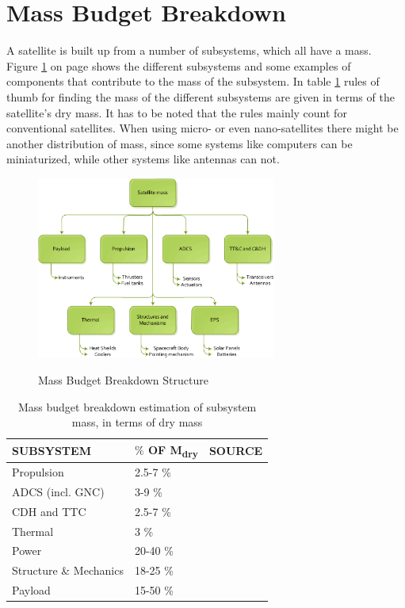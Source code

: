 \section{Mass Budget Breakdown}
\label{sect_mass_budget}
A satellite is built up from a number of subsystems, which all have a mass. Figure \ref{massbreakdown} on page \pageref{massbreakdown} shows the different subsystems and some examples of components that contribute to the mass of the subsystem. In table \ref{rotsubsystemmass} rules of thumb for finding the mass of the different subsystems are given in terms of the satellite's dry mass. It has to be noted that the rules mainly count for conventional satellites. When using micro- or even nano-satellites there might be another distribution of mass, since some systems like computers can be miniaturized, while other systems like antennas can not. 

\begin{figure} [ht]
\centering
\includegraphics[width=0.7\textwidth]{chapters/img/mass_breakdown.png}
\label{massbreakdown}
\caption{Mass Budget Breakdown Structure}
\end{figure}

\begin{table} [h]
\centering
\begin{tabular}{p{12cm} | l | l}
\textbf{SUBSYSTEM} & \textbf{$\%$ OF M\textsubscript{dry}} & \textbf{SOURCE} \\ \hline \hline
Propulsion & 2.5-7 \% & \cite{Space2b} \\ 
\ac{ADCS} (incl. \ac{GNC}) & 3-9 \% & \cite{Space2b} \\ 
\ac{CDH} and \ac{TTC} & 2.5-7 \% & \cite{Space2b} \\ 
Thermal & 3 \% & \cite{larson} \\ 
Power & 20-40 \% & \cite{Space2b} \\ 
Structure \& Mechanics & 18-25 \% & \cite{Space2b} \\ 
Payload & 15-50 \% & \cite{larson} 
\end{tabular} 
\caption{Mass budget breakdown estimation of subsystem mass, in terms of dry mass}
\label{rotsubsystemmass}
\end{table}

